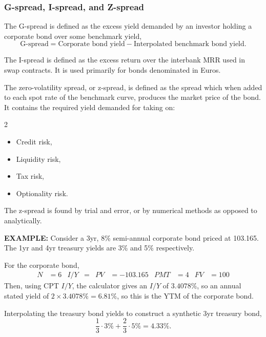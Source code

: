 \documentclass[../notes_compiled.tex]{subfiles}
\begin{document}
\subsubsection{G-spread, I-spread, and Z-spread}
\begin{itemize}
\item The G-spread is defined as the excess yield demanded by an investor holding a corporate bond over some benchmark yield,
\begin{equation}
\text{G-spread} = \text{Corporate bond yield} - \text{Interpolated benchmark bond yield}.
\end{equation}
\item The I-spread is defined as the excess return over the interbank MRR used in swap contracts. It is used primarily for bonds denominated in Euros.
\item The zero-volatility spread, or z-spread, is defined as the spread which when added to each spot rate of the benchmark curve, produces the market price of the bond. It contains the required yield demanded for taking on:
\begin{multicols}{2}
\begin{itemize}
\item Credit risk,
\item Liquidity risk,
\item Tax risk,
\item Optionality risk.
\end{itemize}
\end{multicols}
The z-spread is found by trial and error, or by numerical methods as opposed to analytically.
{\color{RedViolet}
\item[] \textbf{EXAMPLE:} Consider a 3yr, 8\% semi-annual corporate bond priced at 103.165. The 1yr and 4yr treasury yields are 3\% and 5\% respectively.
}
{\color{RoyalBlue}
\item[] For the corporate bond,
\begin{align*}
N&=6  & I / Y &=  & PV &=-103.165 & PMT &=4 & FV &= 100
\end{align*}
Then, using CPT $I / Y$, the calculator gives an $I / Y$ of $3.4078\%$, so an annual stated yield of $2\times 3.4078\% = 6.81\%$, so this is the YTM of the corporate bond.

\item[] Interpolating the treasury bond yields to construct a synthetic 3yr treasury bond,
\begin{equation*}
\frac{1}{3}\cdot3\% + \frac{2}{3}\cdot5\% = 4.33\%.
\end{equation*}

}
\end{itemize}
\end{document}
